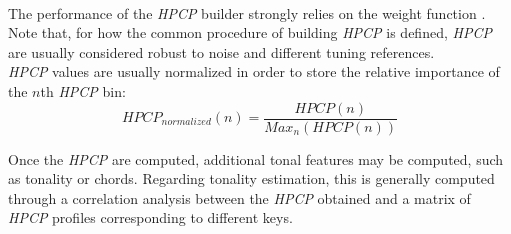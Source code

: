 \begin{itemize}
\\ The performance of the \textit{HPCP} builder strongly relies on the weight function \cite{cabral05}. Note that, for how the common procedure of building \textit{HPCP} is defined, \textit{HPCP} are usually considered robust to noise and different tuning references. \\
\textit{HPCP} values are usually normalized in order to store the relative importance of the $n$th \textit{HPCP} bin:
\begin{equation}
HPCP_{normalized}(n) = \frac{HPCP(n)}{Max_n(HPCP(n))}
\end{equation}
\end{itemize}

Once the \textit{HPCP} are computed, additional tonal features may be computed, such as tonality or chords. Regarding tonality estimation, this is generally computed through a correlation analysis between the \textit{HPCP} obtained and a matrix of \textit{HPCP} profiles corresponding to different keys. 

